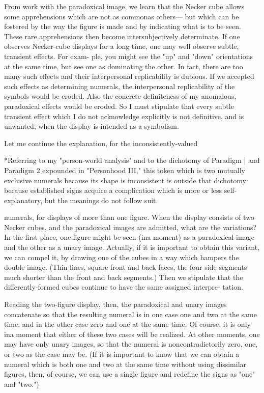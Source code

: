 From work with the paradoxical image, we learn that the Necker 
cube allows some apprehensions which are not as commonas others--- 
but which can be fostered by the way the figure is made and by 
indicating what is to be seen. These rare apprehensions then become 
intersubjectively determinate. If one observes Necker-cube displays for 
a long time, one may well observe subtle, transient effects. For exam- 
ple, you might see the "up" and "down" orientations at the same time, 
but see one as dominating the other. In fact, there are too many such 
effects and their interpersonal replicability is dubious. If we accepted 
such effects as determining numerals, the interpersonal replicability of 
the symbols would be eroded. Also the concrete definiteness of my 
anomalous, paradoxical effects would be eroded. So I must stipulate 
that every subtle transient effect which I do not acknowledge explicitly 
is not definitive, and is unwanted, when the display is intended as a 
symbolism. 

Let me continue the explanation, for the inconsistently-valued 


*Referring to my "person-world analysis" and to the dichotomy of 
Paradigm | and Paradigm 2 expounded in "Personhood III," this token which 
is two mutually exclusive numerals because its shape is inconsistent is outside 
that dichotomy: because established signs acquire a complication which is 
more or less self-explanatory, but the meanings do not follow suit. 


numerals, for displays of more than one figure. When the display 
consists of two Necker cubes, and the paradoxical images are admitted, 
what are the variations? In the first place, one figure might be seen (ina 
moment) as a paradoxical image and the other as a unary image. 
Actually, if it is important to obtain this variant, we can compel it, by 
drawing one of the cubes in a way which hampers the double image. 
(Thin lines, square front and back faces, the four side segments much 
shorter than the front and back segments.) Then we stipulate that the 
differently-formed cubes continue to have the same assigned interpre- 
tation. 


Reading the two-figure display, then, the paradoxical and unary 
images concatenate so that the resulting numeral is in one case one and 
two at the same time; and in the other case zero and one at the same 
time. Of course, it is only ina moment that either of these two cases will 
be realized. At other moments, one may have only unary images, so 
that the numeral is noncontradictorily zero, one, or two as the case may 
be. (If it is important to know that we can obtain a numeral which is 
both one and two at the same time without using dissimilar figures, 
then, of course, we can use a single figure and redefine the signs as "one" 
and "two.") 

